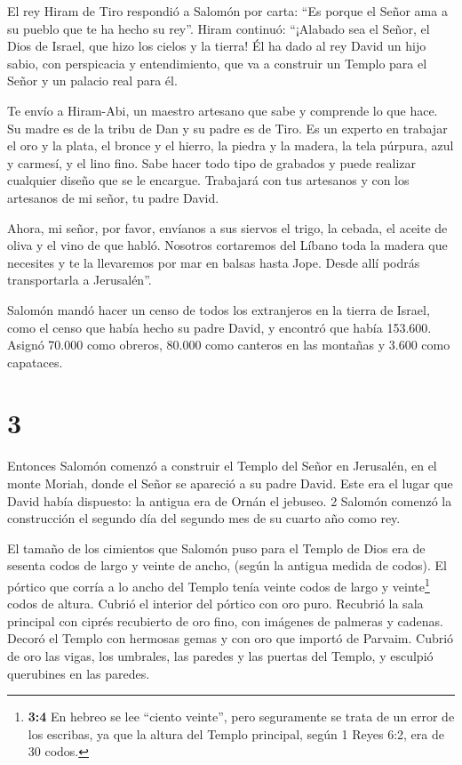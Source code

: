  El rey Hiram de Tiro respondió a Salomón por carta: ``Es
porque el Señor ama a su pueblo que te ha hecho su rey''. 
Hiram continuó: ``¡Alabado sea el Señor, el Dios de Israel, que hizo los
cielos y la tierra! Él ha dado al rey David un hijo sabio, con
perspicacia y entendimiento, que va a construir un Templo para el Señor
y un palacio real para él.

 Te envío a Hiram-Abi, un maestro artesano que sabe y
comprende lo que hace.  Su madre es de la tribu de Dan y su
padre es de Tiro. Es un experto en trabajar el oro y la plata, el bronce
y el hierro, la piedra y la madera, la tela púrpura, azul y carmesí, y
el lino fino. Sabe hacer todo tipo de grabados y puede realizar
cualquier diseño que se le encargue. Trabajará con tus artesanos y con
los artesanos de mi señor, tu padre David.

 Ahora, mi señor, por favor, envíanos a sus siervos el
trigo, la cebada, el aceite de oliva y el vino de que habló.
 Nosotros cortaremos del Líbano toda la madera que
necesites y te la llevaremos por mar en balsas hasta Jope. Desde allí
podrás transportarla a Jerusalén''.

 Salomón mandó hacer un censo de todos los extranjeros en
la tierra de Israel, como el censo que había hecho su padre David, y
encontró que había 153.600.  Asignó 70.000 como obreros,
80.000 como canteros en las montañas y 3.600 como capataces.

\hypertarget{section-2}{%
\section{3}\label{section-2}}

 Entonces Salomón comenzó a construir el Templo del Señor en
Jerusalén, en el monte Moriah, donde el Señor se apareció a su padre
David. Este era el lugar que David había dispuesto: la antigua era de
Ornán el jebuseo. 2 Salomón comenzó la construcción el segundo día del
segundo mes de su cuarto año como rey.

 El tamaño de los cimientos que Salomón puso para el Templo
de Dios era de sesenta codos de largo y veinte de ancho, (según la
antigua medida de codos).  El pórtico que corría a lo ancho
del Templo tenía veinte codos de largo y veinte\footnote{\textbf{3:4} En
  hebreo se lee ``ciento veinte'', pero seguramente se trata de un error
  de los escribas, ya que la altura del Templo principal, según 1 Reyes
  6:2, era de 30 codos.} codos de altura. Cubrió el interior del pórtico
con oro puro.  Recubrió la sala principal con ciprés
recubierto de oro fino, con imágenes de palmeras y cadenas. 
Decoró el Templo con hermosas gemas y con oro que importó de Parvaim.
 Cubrió de oro las vigas, los umbrales, las paredes y las
puertas del Templo, y esculpió querubines en las paredes.

